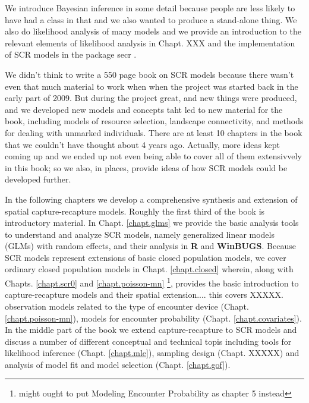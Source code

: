 We introduce Bayesian inference in some
detail because people are less likely to have had a class in that and
we also wanted to produce a stand-alone thing.   We also do
likelihood analysis of many models and we provide an introduction to
the relevant elements of likelihood analysis in Chapt. XXX and the
implementation of SCR models in the package secr \citep{efford_etal:2009euring}.

We didn't
think to write a 550 page book on SCR models because there wasn't even
that much material to work when when the project was started back in
the early part of 2009. But during the project great, and new things were
produced, and we developed new models and concepts taht led to new
material for the book, including models of resource selection,
landscape connectivity, and methods for dealing with unmarked
individuals. There are at least 10 chapters in the book that we
couldn't have thought about 4 years ago. Actually, more ideas kept coming up and we ended up not even being able to cover all of them extensivvely in this book; so we also, in places, provide ideas of how SCR models could be developed further. 

In the following chapters we develop a comprehensive synthesis and
extension of spatial capture-recapture models.  Roughly the first
third of the book is introductory material. In
Chapt. \ref{chapt.glms} we provide the basic analysis tools to
understand and analyze SCR models, namely generalized linear models
(GLMs) with random effects, and their analysis in {\bf R} and {\bf
  WinBUGS}.  Because SCR models represent extensions of basic closed
population models, we cover ordinary closed population models in
Chapt. \ref{chapt.closed} wherein, along with Chapts. \ref{chapt.scr0}
and \ref{chapt.poisson-mn} \footnote{might ought to put Modeling
  Encounter Probability as chapter 5 instead}, provides the basic
introduction to capture-recapture models and their spatial
extension.... this covers XXXXX.  observation models related to the
type of encounter device (Chapt. \ref{chapt.poisson-mn}), models for
encounter probability (Chapt. \ref{chapt.covariates}). In the middle
part of the book we extend capture-recapture to SCR models and discuss
a number of different conceptual and technical topis including tools
for likelihood inference (Chapt. \ref{chapt.mle}), sampling design
(Chapt. XXXXX) and analysis of model fit and model selection
(Chapt. \ref{chapt.gof}).

